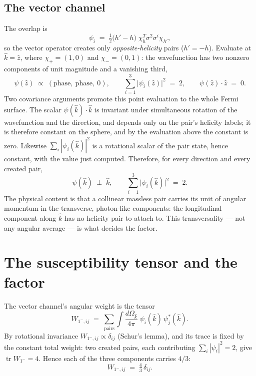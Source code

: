 \documentclass[11pt]{article}
\begin{document}
\subsection{The vector channel}

The overlap is
\begin{equation}
\psi_i \;=\; \tfrac{1}{2}\big(h' - h\big)\; \chi_h^{T} \sigma^2 \sigma^i \chi_{h'} ,
\end{equation}
so the vector operator creates only \emph{opposite-helicity} pairs ($h' = -h$). Evaluate at $\hat k = \hat z$, where $\chi_+ = (1,0)$ and $\chi_- = (0,1)$: the wavefunction has two nonzero components of unit magnitude and a vanishing third,
\begin{equation}
\psi(\hat z) \;\propto\; (\text{phase},\ \text{phase},\ 0),
\qquad
\sum_{i=1}^{3} \big| \psi_i(\hat z) \big|^2 \;=\; 2,
\qquad
\psi(\hat z) \cdot \hat z \;=\; 0.
\end{equation}
Two covariance arguments promote this point evaluation to the whole Fermi surface. The scalar $\psi(\hat k) \cdot \hat k$ is invariant under simultaneous rotation of the wavefunction and the direction, and depends only on the pair's helicity labels; it is therefore constant on the sphere, and by the evaluation above the constant is zero. Likewise $\sum_i |\psi_i(\hat k)|^2$ is a rotational scalar of the pair state, hence constant, with the value just computed. Therefore, for every direction and every created pair,
\begin{equation}
\psi(\hat k) \;\perp\; \hat k,
\qquad
\sum_{i=1}^{3} \big| \psi_i(\hat k) \big|^2 \;=\; 2.
\end{equation}
The physical content is that a collinear massless pair carries its unit of angular momentum in the transverse, photon-like components: the longitudinal component along $\hat k$ has no helicity pair to attach to. This transversality --- not any angular average --- is what decides the factor.

\section{The susceptibility tensor and the factor}

The vector channel's angular weight is the tensor
\begin{equation}
W_{1^-,ij} \;=\; \sum_{\text{pairs}} \int \frac{d\Omega_{\hat k}}{4\pi}\; \psi_i(\hat k)\, \psi_j^*(\hat k).
\end{equation}
By rotational invariance $W_{1^-,ij} \propto \delta_{ij}$ (Schur's lemma), and its trace is fixed by the constant total weight: two created pairs, each contributing $\sum_i |\psi_i|^2 = 2$, give $\operatorname{tr} W_{1^-} = 4$. Hence each of the three components carries $4/3$:
\begin{equation}
W_{1^-,ij} \;=\; \tfrac{4}{3}\, \delta_{ij}.
\end{equation}
\end{document}
